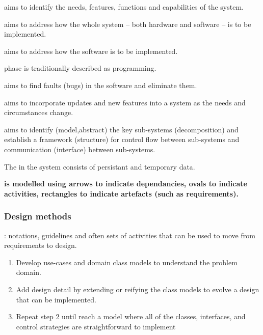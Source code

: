 \begin{compactitem}
\item {} aims to identify the needs, features, functions and capabilities of the system.
\item {} aims to address how the whole system – both hardware and software – is to be implemented.
\item {} aims to address how the software is to be implemented.
\item {} phase is traditionally described as programming. 
\item {} aims to find faults (bugs) in the software and eliminate them.
\item {} aims to incorporate updates and new features into a system as the needs and circumstances change. 
\item {} aims to identify (model,abstract) the key sub-systems (decomposition) and establish a  framework (structure) for control flow between sub-systems and communication (interface) between sub-systems. 
\item The  in the system consists of persistant and temporary data.
\item \bf{ is modelled using arrows to indicate dependancies, ovals to indicate activities, rectangles to indicate artefacts (such as requirements)}.
\end{compactitem}


\subsubsection{Design methods} 
\begin{compactitem}
\item {}: notations, guidelines and often
sets of activities that can be used to move from
requirements to design.
\item {} \begin{enumerate}
\item Develop use-cases and domain class models to understand the problem domain. 
\item Add design detail by extending or reifying the class models to evolve a design that can be implemented.
\item Repeat step 2 until reach a model where all of the classes, interfaces, and control strategies are straightforward to implement
\end{enumerate}
\end{compactitem}

